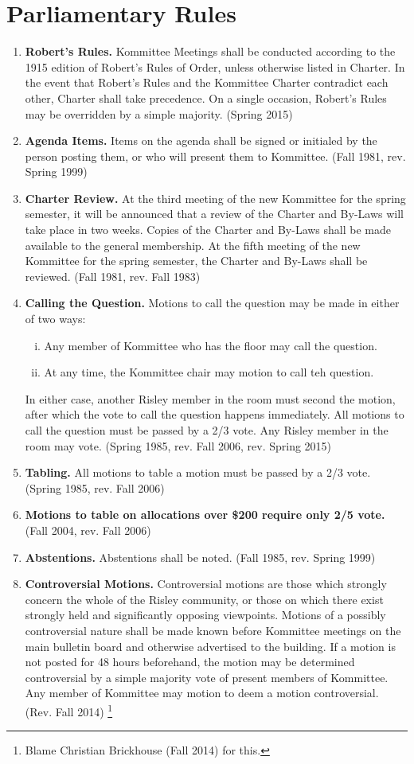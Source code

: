 \documentclass[12pt]{article}
\begin{document}
\section*{Parliamentary Rules}
\begin{enumerate}[1.]
\item \textbf{Robert's Rules.} Kommittee Meetings shall be conducted according to the 1915 edition of Robert's Rules of Order, unless otherwise listed in Charter. In the event that Robert's Rules and the Kommittee Charter contradict each other, Charter shall take precedence.  On a single occasion, Robert's Rules may be overridden by a simple majority. (Spring 2015)
\item \textbf{Agenda Items.} Items on the agenda shall be signed or initialed by the person posting them, or who will present them to Kommittee. (Fall 1981, rev. Spring 1999)
\item \textbf{Charter Review.} At the third meeting of the new Kommittee for the spring semester, it will be announced that a review of the Charter and By-Laws will take place in two weeks. Copies of the Charter and By-Laws shall be made available to the general membership. At the fifth meeting of the new Kommittee for the spring semester, the Charter and By-Laws shall be reviewed. (Fall 1981, rev. Fall 1983)
\item \textbf{Calling the Question.} Motions to call the question may be made in either of two ways:
\begin{enumerate}[i.]
\item Any member of Kommittee who has the floor may call the question.
\item At any time, the Kommittee chair may motion to call teh question.
\end{enumerate}
In either case, another Risley member in the room must second the motion, after which the vote to call the question happens immediately. All motions to call the question must be passed by a 2/3 vote. Any Risley member in the room may vote. (Spring 1985, rev. Fall 2006, rev. Spring 2015)
\item \textbf{Tabling.} All motions to table a motion must be passed by a 2/3 vote. (Spring 1985, rev. Fall 2006)
\item \textbf{Motions to table on allocations over \$200 require only 2/5 vote.} (Fall 2004, rev. Fall 2006)
\item \textbf{Abstentions.} Abstentions shall be noted. (Fall 1985, rev. Spring 1999)
\item \textbf{Controversial Motions.} Controversial motions are those which strongly concern the whole of the Risley community, or those on which there exist strongly held and significantly opposing viewpoints. Motions of a possibly controversial nature shall be made known before Kommittee meetings on the main bulletin board and otherwise advertised to the building. If a motion is not posted for 48 hours beforehand, the motion may be determined controversial by a simple majority vote of present members of Kommittee. Any member of Kommittee may motion to deem a motion controversial. (Rev. Fall 2014) \footnote{Blame Christian Brickhouse (Fall 2014) for this.}

\end{enumerate}
\end{document}
